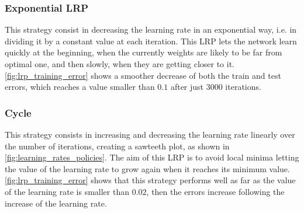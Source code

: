 \subsubsection{Exponential \ac{LRP}}
This strategy consist in decreasing the learning rate in an exponential way, i.e. in dividing it by a constant value at each iteration.
This \ac{LRP} lets the network learn quickly at the beginning, when the currently weights are likely to be far from optimal one, and then slowly, when they are getting closer to it.
\cref{fig:lrp_training_error} shows a smoother decrease of both the train and test errors, which reaches a value smaller than $0.1$ after just $3000$ iterations.

\subsubsection{Cycle}
This strategy consists in increasing and decreasing the learning rate linearly over the number of iterations, creating a sawteeth plot, as shown in \cref{fig:learning_rates_policies}.
The aim of this \ac{LRP} is to avoid local minima letting the value of the learning rate to grow again when it reaches its minimum value.
\cref{fig:lrp_training_error} shows that this strategy performs well as far as the value of the learning rate is smaller than $0.02$, then the errors increase following the increase of the learning rate.
